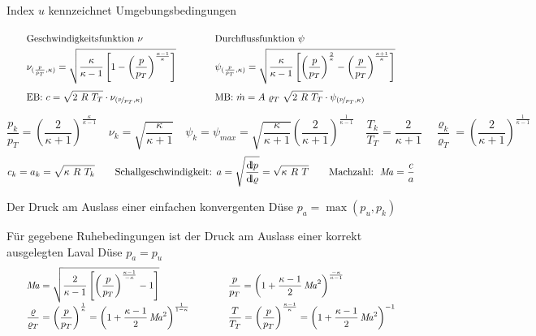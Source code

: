 	Index $ u $ kennzeichnet Umgebungsbedingungen
%
	\skipabove{0pt}
		\[ \arraycolsep=2em\def\arraystretch{2}
		\begin{array}{ll}
			  \text{Geschwindigkeitsfunktion }  \nu & \text{Durchflussfunktion }  \psi
			\\
			   \nu_{(\frac{p}{p_T},\kappa)} =
			  	\sqrt{\dfrac{\kappa}{\kappa-1}
			  		\left[1 -
			  			\left(\dfrac{p}{p_T}\right)
			  				^{\frac{\kappa-1}{\kappa}}
			  		\right]}
			&  \psi_{(\frac{p}{p_T},\kappa)} =
				\sqrt{ \dfrac{\kappa}{\kappa-1}
					\left[
						\left(\dfrac{p}{p_T}\right)
							^{\frac{2}{\kappa}}
							-
						\left(\dfrac{p}{p_T}\right)
							^{\frac{\kappa+1}{\kappa}}
					\right]}
			\\
			  \text{EB: } c = \displaystyle\sqrt{2\ R\ T_T} \cdot \nu_{(\nicefrac{p}{p_T},\kappa)}
			& \text{MB: } \dot{m} = A\ \varrho_T\ \displaystyle\sqrt{2\ R\ T_T} \cdot \psi_{(\nicefrac{p}{p_T},\kappa)}
		\end{array}\]
%
	\skipabove{0pt}
	\[
		\dfrac{p_k}{p_T} =
			\left(\dfrac{2}{\kappa+1}\right)
				^{\frac{\kappa}{\kappa-1}}
	\quad
		\nu_k = \sqrt{\dfrac{\kappa}{\kappa+1}}
	\quad
		\psi_k = \psi_{max} =
			\sqrt{\dfrac{\kappa}{\kappa+1}}
			\left(\dfrac{2}{\kappa+1}\right)
				^{\frac{1}{\kappa-1}}
	\quad
		\dfrac{T_k}{T_T} = \dfrac{2}{\kappa + 1}
	\quad
		\dfrac{\varrho_k}{\varrho_T} =
			\left(\dfrac{2}{\kappa+1}\right)
				^{\frac{1}{\kappa-1}}
	 \]
%
	\[
		c_k = a_k = \sqrt{\kappa \ R\ T_k}
	\qquad
		\text{Schallgeschwindigkeit: }
		a = \sqrt{\dfrac{{\operatorname{d\!l}} p}{{\operatorname{d\!l}}\varrho}}
			= \sqrt{\kappa \ R\ T}
	\qquad
		\text{Machzahl: }
		\operatorname{\mathit{M\kern-.20em a}} = \dfrac{c}{a}
	 \]

	Der Druck am Auslass einer einfachen konvergenten Düse $ p_a = \max(p_u, p_k) $

	Für gegebene Ruhebedingungen ist der Druck am Auslass einer korrekt ausgelegten Laval Düse $ p_a = p_u  $
%
	\skipabove{10pt}
	\[ \arraycolsep=2em\def\arraystretch{2}
	\begin{array}{ll}
		\Mach  =
		\sqrt{\dfrac{2}{\kappa-1}
			\left[\left(
				\dfrac{p}{p_T}
				\right)
					^{\frac{\kappa-1}{- \kappa}} - 1
			\right]}
		&
		\dfrac{p}{p_T}  =
			\left( 1 +
				\dfrac{\kappa-1}{2}  \Mach^2
			\right)
				^{\frac{- \kappa}{\kappa - 1}}
	\\
		\dfrac{\varrho}{\varrho_T}  =
		\left( \dfrac{p}{p_T} \right)
			^{\frac{1}{\kappa}} =
		\left( 1 +
			\dfrac{\kappa-1}{2}  \Mach^2
		\right)
			^{\frac{1}{1-\kappa}}
		&
		\dfrac{T}{T_T}  =
		\left( \dfrac{p}{p_T} \right)
			^{\frac{\kappa-1}{\kappa}} =
		\left( 1 +
			\dfrac{\kappa-1}{2}  \Mach^2
		\right)
			^{-1}
	\end{array}\]

